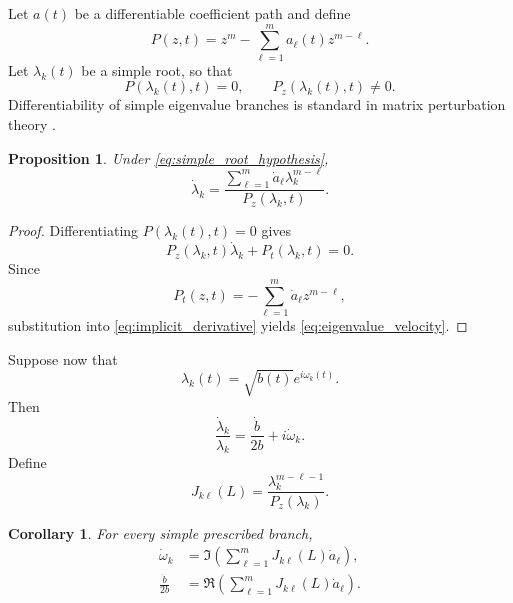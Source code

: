 \documentclass[11pt]{amsart}
\numberwithin{equation}{section}
\theoremstyle{plain}
\newtheorem{proposition}[theorem]{Proposition}
\newtheorem{corollary}[theorem]{Corollary}
\theoremstyle{definition}
\theoremstyle{remark}
\begin{document}
Let $a(t)$ be a differentiable coefficient path and define
\begin{equation}
P(z,t)=z^m-\sum_{\ell=1}^{m}a_\ell(t)z^{m-\ell}.
\label{eq:time_polynomial}
\end{equation}
Let $\lambda_k(t)$ be a simple root, so that
\begin{equation}
P(\lambda_k(t),t)=0,
\qquad
P_z(\lambda_k(t),t)\neq0.
\label{eq:simple_root_hypothesis}
\end{equation}
Differentiability of simple eigenvalue branches is standard in matrix perturbation theory \cite{Yener2023}.

\begin{proposition}
\label{prop:first_derivative}
Under \eqref{eq:simple_root_hypothesis},
\begin{equation}
\dot\lambda_k
=
\frac{
\displaystyle
\sum_{\ell=1}^{m}
\dot a_\ell\lambda_k^{m-\ell}
}{P_z(\lambda_k,t)}.
\label{eq:eigenvalue_velocity}
\end{equation}
\end{proposition}

\begin{proof}
Differentiating $P(\lambda_k(t),t)=0$ gives
\begin{equation}
P_z(\lambda_k,t)\dot\lambda_k
+P_t(\lambda_k,t)=0.
\label{eq:implicit_derivative}
\end{equation}
Since
\begin{equation}
P_t(z,t)
=-\sum_{\ell=1}^{m}\dot a_\ell z^{m-\ell},
\label{eq:polynomial_time_derivative}
\end{equation}
substitution into \eqref{eq:implicit_derivative} yields \eqref{eq:eigenvalue_velocity}.
\end{proof}

Suppose now that
\begin{equation}
\lambda_k(t)=\sqrt{b(t)}e^{i\omega_k(t)}.
\label{eq:critical_root_parameterization}
\end{equation}
Then
\begin{equation}
\frac{\dot\lambda_k}{\lambda_k}
=
\frac{\dot b}{2b}+i\dot\omega_k.
\label{eq:logarithmic_root_velocity}
\end{equation}
Define
\begin{equation}
J_{k\ell}(L)
=
\frac{\lambda_k^{m-\ell-1}}{P_z(\lambda_k)}.
\label{eq:spectral_transport_matrix}
\end{equation}

\begin{corollary}
\label{cor:phase_and_radius_velocity}
For every simple prescribed branch,
\begin{align}
\dot\omega_k
&=
\Im\left(
\sum_{\ell=1}^{m}J_{k\ell}(L)\dot a_\ell
\right),
\label{eq:angular_velocity}\\
\frac{\dot b}{2b}
&=
\Re\left(
\sum_{\ell=1}^{m}J_{k\ell}(L)\dot a_\ell
\right).
\label{eq:radial_velocity}
\end{align}
\end{corollary}
\end{document}

